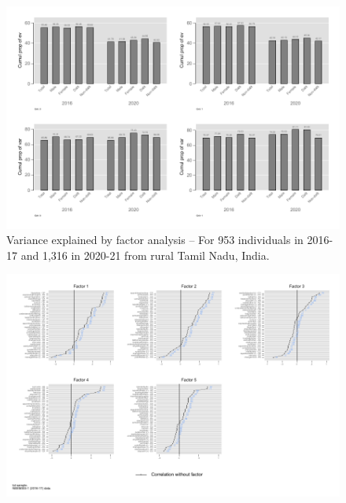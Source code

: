 \documentclass[a4paper, 12pt, onecolumn]{article}
\begin{document}
\begin{figure}[!h]
\raggedright
\includegraphics[scale=0.8]{INPUT/cumul}
\caption{Variance explained by factor analysis -- For 953 individuals in 2016-17 and 1,316 in 2020-21 from rural Tamil Nadu, India.}
\label{fig:varexp}
\end{figure}


\begin{figure}[!h]
\raggedright
\includegraphics[scale=0.8]{INPUT/factor2016_tot_without}
\caption{}
\label{fig:efa16}
\end{figure}
\end{document}
